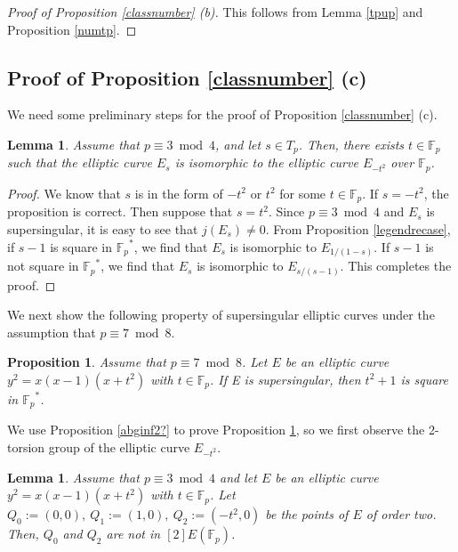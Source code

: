 \documentclass[10pt,a4paper]{amsart}
\theoremstyle{plain}
\newtheorem{prop}[defn]{Proposition}
\newtheorem{lem}[defn]{Lemma}
\newcommand{\fp}{\mathbb{F}_p}
\begin{document}
\begin{proof}[Proof of Proposition \ref{classnumber} \rm{(b)}]
This follows from Lemma \ref{tpup} and Proposition \ref{numtp}.
    
\end{proof}

\subsection{Proof of Proposition{ \ref{classnumber}} (c)}

We need some preliminary steps for the proof of Proposition \ref{classnumber} (c).

\begin{lem}
\label{exist-t^2}
    Assume that $p \equiv 3\bmod 4 $, and let $s \in T_p$. Then, there exists $t\in \fp$ such that the elliptic curve $E_s$ is isomorphic to the elliptic curve $E_{-t^2}$ over $\fp$.
\end{lem}
\begin{proof}
   We know that $s$ is in the form of $-t^2$ or $t^2 $ for some $ t \in \fp$. If $s=-t^2$, the proposition is correct. Then suppose that $s=t^2$. Since $p \equiv 3 \bmod 4$ and $E_s$ is supersingular, it is easy to see that $j(E_{s}) \neq 0$. From Proposition \ref{legendrecase}, if $s-1$ is square in ${\fp}^{*}$, we find that $E_s$ is isomorphic to $E_{1/(1-s)}$. If $s-1$ is not square in ${\fp}^{*}$, we find that $E_s$ is isomorphic to $E_{s/(s-1)}$. This completes the proof.  
\end{proof}

We next show the following property of supersingular elliptic curves under the assumption that $p \equiv 7 \bmod 8$.

\begin{prop}
\label{t^2+1inf2}
    Assume that $p \equiv 7 \bmod 8$. Let $E$ be an elliptic curve $y^2=x(x-1)(x+t^2)$ with $ t \in \fp$. If E is supersingular, then $t^2+1$ is square in ${\fp}^{*}$.
\end{prop}

We use Proposition \ref{abginf2?} to prove Proposition \ref{t^2+1inf2}, so we first observe the 2-torsion group of the elliptic curve $E_{-t^2}$.


\begin{lem}
    \label{ifker2in2}
    Assume that $p \equiv 3 \bmod 4$ and let $E$ be an elliptic curve $y^2=x(x-1)(x+t^2)$ with $t \in \fp$. Let $Q_0:=(0,0),\ Q_1:=(1,0),\ Q_2:=(-t^2,0)$ be the points of $E$ of order two. Then, $Q_0 $ and $Q_2$ are not in $[2]E(\fp)$.
\end{lem}
\end{document}
